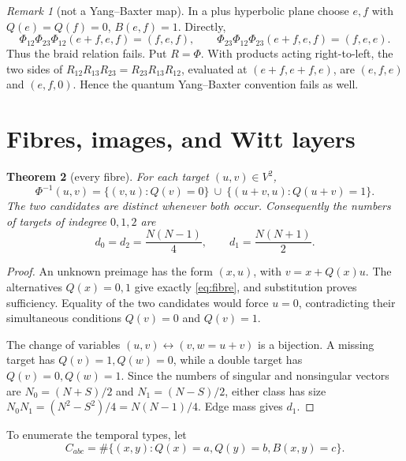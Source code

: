 \documentclass[10pt,a4paper]{amsart}
\newtheorem{theorem}{Theorem}[section]
\theoremstyle{definition}
\theoremstyle{remark}
\newtheorem{remark}[theorem]{Remark}
\numberwithin{equation}{section}
\begin{document}
\begin{remark}[not a Yang--Baxter map]\label{rem:ybe}
In a plus hyperbolic plane choose \(e,f\) with
\(Q(e)=Q(f)=0\), \(B(e,f)=1\).  Directly,
\[
 \Phi_{12}\Phi_{23}\Phi_{12}(e+f,e,f)=(f,e,f),\qquad
 \Phi_{23}\Phi_{12}\Phi_{23}(e+f,e,f)=(f,e,e).
\]
Thus the braid relation fails.  Put \(R=\Phi\).  With products acting
right-to-left, the two sides of
\(R_{12}R_{13}R_{23}=R_{23}R_{13}R_{12}\), evaluated at
\((e+f,e+f,e)\), are \((e,f,e)\) and \((e,f,0)\).  Hence the quantum
Yang--Baxter convention fails as well.
\end{remark}

\section{Fibres, images, and Witt layers}

\begin{theorem}[every fibre]\label{thm:fibre}
For each target \((u,v)\in V^2\),
\begin{equation}
 \Phi^{-1}(u,v)=
 \{(v,u):Q(v)=0\}\ \cup\
 \{(u+v,u):Q(u+v)=1\}.                                  \label{eq:fibre}
\end{equation}
The two candidates are distinct whenever both occur.  Consequently the
numbers of targets of indegree \(0,1,2\) are
\begin{equation}
 d_0=d_2=\frac{N(N-1)}4,
 \qquad d_1=\frac{N(N+1)}2.                              \label{eq:fibrehist}
\end{equation}
\end{theorem}

\begin{proof}
An unknown preimage has the form \((x,u)\), with
\(v=x+Q(x)u\).  The alternatives \(Q(x)=0,1\) give exactly
\eqref{eq:fibre}, and substitution proves sufficiency.  Equality of the two
candidates would force \(u=0\), contradicting their simultaneous conditions
\(Q(v)=0\) and \(Q(v)=1\).

The change of variables \((u,v)\leftrightarrow(v,w=u+v)\) is a bijection.
A missing target has \(Q(v)=1,Q(w)=0\), while a double target has
\(Q(v)=0,Q(w)=1\).  Since the numbers of singular and nonsingular vectors are
\(N_0=(N+S)/2\) and \(N_1=(N-S)/2\), either class has size
\(N_0N_1=(N^2-S^2)/4=N(N-1)/4\).  Edge mass gives \(d_1\).
\end{proof}

To enumerate the temporal types, let
\[
 C_{abc}=\#\{(x,y):Q(x)=a,Q(y)=b,B(x,y)=c\}.
\]
\end{document}
